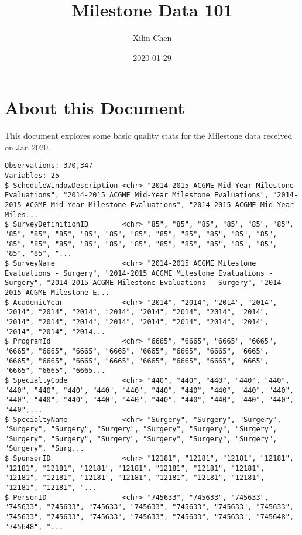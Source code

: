 \documentclass[]{article}
\title{Milestone Data 101}
\author{Xilin Chen}
\date{2020-01-29}
\begin{document}
\maketitle

\hypertarget{about-this-document}{%
\section{About this Document}\label{about-this-document}}

This document explores some basic quality stats for the Milestone data
received on Jan 2020.

\begin{verbatim}
Observations: 370,347
Variables: 25
$ ScheduleWindowDescription <chr> "2014-2015 ACGME Mid-Year Milestone Evaluations", "2014-2015 ACGME Mid-Year Milestone Evaluations", "2014-2015 ACGME Mid-Year Milestone Evaluations", "2014-2015 ACGME Mid-Year Miles...
$ SurveyDefinitionID        <chr> "85", "85", "85", "85", "85", "85", "85", "85", "85", "85", "85", "85", "85", "85", "85", "85", "85", "85", "85", "85", "85", "85", "85", "85", "85", "85", "85", "85", "85", "85", "...
$ SurveyName                <chr> "2014-2015 ACGME Milestone Evaluations - Surgery", "2014-2015 ACGME Milestone Evaluations - Surgery", "2014-2015 ACGME Milestone Evaluations - Surgery", "2014-2015 ACGME Milestone E...
$ AcademicYear              <chr> "2014", "2014", "2014", "2014", "2014", "2014", "2014", "2014", "2014", "2014", "2014", "2014", "2014", "2014", "2014", "2014", "2014", "2014", "2014", "2014", "2014", "2014", "2014...
$ ProgramId                 <chr> "6665", "6665", "6665", "6665", "6665", "6665", "6665", "6665", "6665", "6665", "6665", "6665", "6665", "6665", "6665", "6665", "6665", "6665", "6665", "6665", "6665", "6665", "6665...
$ SpecialtyCode             <chr> "440", "440", "440", "440", "440", "440", "440", "440", "440", "440", "440", "440", "440", "440", "440", "440", "440", "440", "440", "440", "440", "440", "440", "440", "440", "440",...
$ SpecialtyName             <chr> "Surgery", "Surgery", "Surgery", "Surgery", "Surgery", "Surgery", "Surgery", "Surgery", "Surgery", "Surgery", "Surgery", "Surgery", "Surgery", "Surgery", "Surgery", "Surgery", "Surg...
$ SponsorID                 <chr> "12181", "12181", "12181", "12181", "12181", "12181", "12181", "12181", "12181", "12181", "12181", "12181", "12181", "12181", "12181", "12181", "12181", "12181", "12181", "12181", "...
$ PersonID                  <chr> "745633", "745633", "745633", "745633", "745633", "745633", "745633", "745633", "745633", "745633", "745633", "745633", "745633", "745633", "745633", "745633", "745648", "745648", "...

\end{verbatim}
\end{document}
